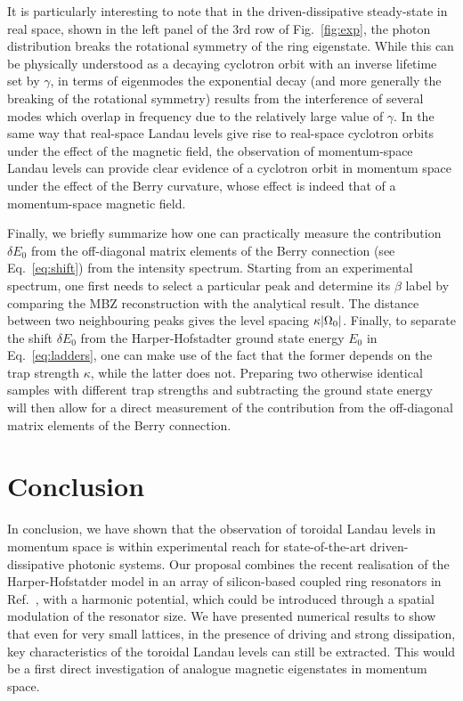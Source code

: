 It is particularly interesting to note that in the driven-dissipative steady-state in real space, shown in the left panel of the 3rd row of Fig.~\ref{fig:exp}, the photon distribution breaks the rotational symmetry of the ring eigenstate. While this can be physically understood 
as a
decaying cyclotron orbit with an inverse lifetime set by $\gamma$, in terms of eigenmodes the exponential decay (and more generally the breaking of the rotational symmetry) results from the interference of several modes which overlap in frequency due to the relatively large value of $\gamma$.
In the same way that real-space Landau
levels give rise to real-space cyclotron orbits under the effect of the magnetic field, the observation of momentum-space
Landau levels can provide clear evidence of a cyclotron orbit in momentum space under the effect of the Berry curvature, whose effect is indeed that of a momentum-space magnetic field.

Finally, we briefly summarize how one can practically measure the
contribution $\delta E_0$ from the off-diagonal matrix elements of the Berry connection
 (see Eq.~\eqref{eq:shift}) from the intensity spectrum. Starting from an experimental
spectrum, one first needs to select a particular peak and determine
its $\beta$ label by comparing the MBZ reconstruction with the
analytical result. The distance between two neighbouring peaks gives
the level spacing $\kappa \vert \Omega_0 \vert$. Finally, to separate the shift $\delta E_0$ from the Harper-Hofstadter ground state
energy $E_0$ in Eq.~\eqref{eq:ladders}, one can make use of the fact
that the former depends on the trap strength $\kappa$, while the
latter does not. Preparing two otherwise identical samples with different trap
strengths and subtracting the ground state energy will then allow for a
direct measurement of the contribution from the off-diagonal matrix elements of the Berry connection. 

\section{Conclusion}
\label{sec:conclusion}

In conclusion, we have shown that the observation of toroidal Landau levels in momentum
space is within experimental reach for state-of-the-art driven-dissipative photonic
systems. Our proposal combines the recent realisation of the Harper-Hofstatder model in an array of silicon-based coupled ring resonators in
Ref.~\cite{hafezi2013imaging}, with a harmonic potential, which could be introduced through a spatial modulation of the resonator size. We have presented numerical results to show that even for very small lattices, in the presence of driving and strong dissipation, key characteristics of the toroidal Landau levels can still be extracted. This would be a first direct investigation of analogue magnetic eigenstates in momentum space. 

